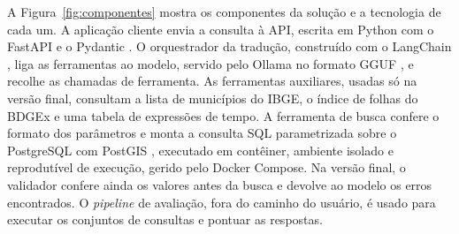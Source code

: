 A Figura~\ref{fig:componentes} mostra os componentes da solução e a tecnologia de cada um. A aplicação cliente envia a consulta à API, escrita em Python com o FastAPI \cite{fastapi2018} e o Pydantic \cite{pydantic2019}. O orquestrador da tradução, construído com o LangChain \cite{langchain2022}, liga as ferramentas ao modelo, servido pelo Ollama \cite{ollama2023} no formato GGUF \cite{gguf2023}, e recolhe as chamadas de ferramenta. As ferramentas auxiliares, usadas só na versão final, consultam a lista de municípios do IBGE, o índice de folhas do BDGEx e uma tabela de expressões de tempo. A ferramenta de busca confere o formato dos parâmetros e monta a consulta SQL parametrizada sobre o PostgreSQL com PostGIS \cite{postgis2001}, executado em contêiner, ambiente isolado e reprodutível de execução, gerido pelo Docker Compose. Na versão final, o validador confere ainda os valores antes da busca e devolve ao modelo os erros encontrados. O \textit{pipeline} de avaliação, fora do caminho do usuário, é usado para executar os conjuntos de consultas e pontuar as respostas.

